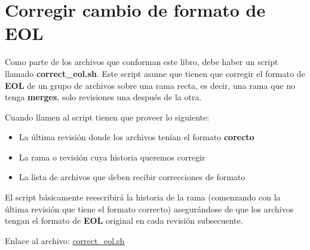 
\section{Corregir cambio de formato de EOL}
\label{correct_eol_history}

Como parte de los archivos que conforman este libro, debe haber un script llamado {\bf correct\_eol.sh}. Este script asume
que tienen que corregir el formato de {\bf EOL} de un grupo de archivos sobre una rama recta, es decir, una rama que no tenga {\bf merges},
solo revisiones una después de la otra.

Cuando llamen al script tienen que proveer lo siguiente:

\begin{itemize}
	\item La última revisión donde los archivos tenían el formato {\bf corecto}
	\item La rama o revisión cuya historia queremos corregir
	\item La lista de archivos que deben recibir correcciones de formato
\end{itemize}

El script básicamente reescribirá la historia de la rama (comenzando con la última revisión que tiene el formato correcto)
asegurándose de que los archivos tengan el formato de {\bf EOL} original en cada revisión subsecuente.

Enlace al archivo: \href{https://github.com/eantoranz/conflict_book/blob/main/scripts/correct_eol.sh}{correct\_eol.sh}
